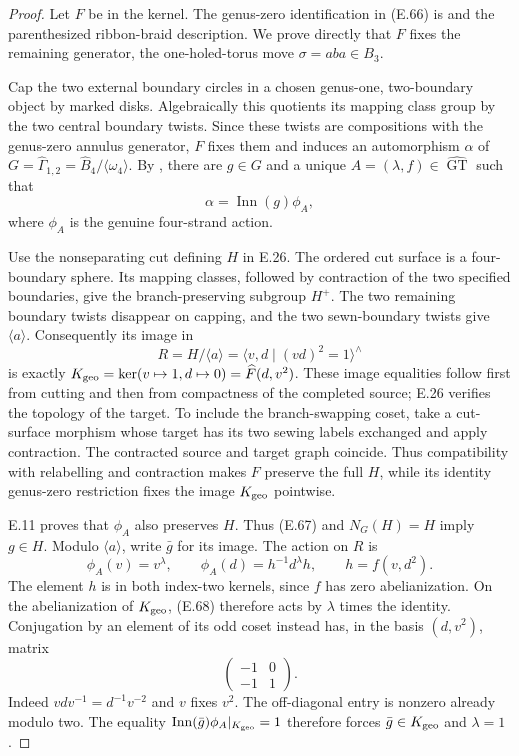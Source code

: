 \begin{proof}
Let $F$ be in the kernel.  The genus-zero
identification in (E.66) is
\cite[Propositions 3.16 and 4.7]{ET_BonattoRobertson2026}
and the parenthesized ribbon-braid description.
We prove directly that $F$ fixes the remaining
generator, the one-holed-torus move
$\sigma=aba\in B_3$.

Cap the two external boundary circles in a
chosen genus-one, two-boundary object by marked
disks.  Algebraically this quotients its mapping
class group by the two central boundary twists.
Since these twists are compositions with the
genus-zero annulus generator, $F$ fixes them
and induces an automorphism $\alpha$ of
$G=\widehat\Gamma_{1,2}=\widehat B_4/
\langle\omega _4\rangle$.
By \cite[Theorem 4.3(i) and Corollary C]{ET_MN2022},
there are $g\in G$ and a unique
$A=(\lambda,f)\in\widehat{\operatorname{GT}}$ such that
\[
             \alpha=\operatorname{Inn}(g)\phi_A,         \tag{E.67}
\]
where $\phi_A$ is the genuine four-strand action.

Use the nonseparating cut defining $H$ in E.26.
The ordered cut surface is a four-boundary
sphere.  Its mapping classes, followed by
contraction of the two specified boundaries,
give the branch-preserving subgroup $H^+$.
The two remaining boundary twists disappear
on capping, and the two sewn-boundary twists
give $\langle a\rangle$.  Consequently its image
in
\[
 R=H/\langle a\rangle
    =\langle v,d\mid(vd)^2=1\rangle^{\wedge}
\]
is exactly
$K_{\rm geo}=\ker(v\mapsto1,d\mapsto0)=
\widehat F(d,v^2)$.
These image equalities follow first from cutting
and then from compactness of the completed
source; E.26 verifies the topology of the target.
To include the branch-swapping coset, take a
cut-surface morphism whose target has its two
sewing labels exchanged and apply contraction.
The contracted source and target graph coincide.
Thus compatibility with relabelling and
contraction makes $F$ preserve the full $H$,
while its identity genus-zero restriction fixes
the image $K_{\rm geo}$ pointwise.

E.11 proves that $\phi_A$ also preserves $H$.
Thus (E.67) and $N_G(H)=H$ imply $g\in H$.
Modulo $\langle a\rangle$, write $\bar g$ for
its image.  The action on $R$ is
\[
 \phi_A(v)=v^\lambda,
 \qquad \phi_A(d)=h^{-1}d^\lambda h,
 \qquad h=f(v,d^2).                                     \tag{E.68}
\]
The element $h$ is in both index-two kernels,
since $f$ has zero abelianization.  On the
abelianization of $K_{\rm geo}$, (E.68) therefore
acts by $\lambda$ times the identity.
Conjugation by an element of its odd coset
instead has, in the basis $(d,v^2)$, matrix
\[
                 \begin{pmatrix}-1&0\\-1&1\end{pmatrix}.
                                                               \tag{E.69}
\]
Indeed $vdv^{-1}=d^{-1}v^{-2}$ and $v$ fixes
$v^2$.  The off-diagonal entry is nonzero
already modulo two.  The equality
$\operatorname{Inn}(\bar g)\phi_A|_{K_{\rm geo}}=1$
therefore forces $\bar g\in K_{\rm geo}$
and $\lambda=1$.


\end{proof}
